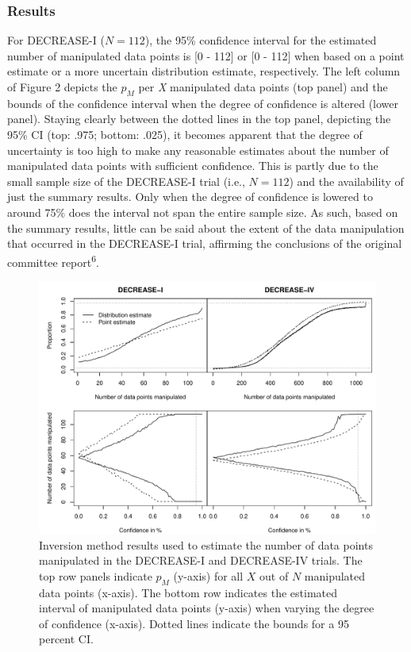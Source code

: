 \documentclass[]{article}
\begin{document}
\subsubsection{Results}\label{results-2}

For DECREASE-I (\(N=112\)), the 95\% confidence interval for the
estimated number of manipulated data points is {[}0 - 112{]} or {[}0 -
112{]} when based on a point estimate or a more uncertain distribution
estimate, respectively. The left column of Figure 2 depicts the \(p_M\)
per \emph{X} manipulated data points (top panel) and the bounds of the
confidence interval when the degree of confidence is altered (lower
panel). Staying clearly between the dotted lines in the top panel,
depicting the 95\% CI (top: .975; bottom: .025), it becomes apparent
that the degree of uncertainty is too high to make any reasonable
estimates about the number of manipulated data points with sufficient
confidence. This is partly due to the small sample size of the
DECREASE-I trial (i.e., \(N=112\)) and the availability of just the
summary results. Only when the degree of confidence is lowered to around
75\% does the interval not span the entire sample size. As such, based
on the summary results, little can be said about the extent of the data
manipulation that occurred in the DECREASE-I trial, affirming the
conclusions of the original committee report\textsuperscript{6}.

\begin{figure}

{\centering \includegraphics[width=0.8\linewidth]{../figures/fig3} 

}

\caption{Inversion method results used to estimate the number of data points manipulated in the DECREASE-I and DECREASE-IV trials. The top row panels indicate $p_M$ (y-axis) for all $X$ out of $N$ manipulated data points (x-axis). The bottom row indicates the estimated interval of manipulated data points (y-axis) when varying the degree of confidence (x-axis). Dotted lines indicate the bounds for a 95 percent CI.}\label{fig:figure 3}
\end{figure}
\end{document}
